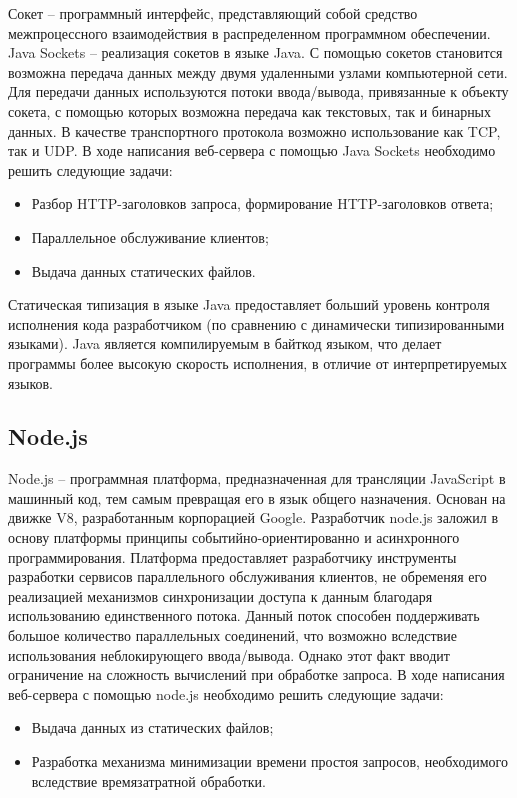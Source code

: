 Сокет – программный интерфейс, представляющий собой средство межпроцессного взаимодействия в распределенном программном обеспечении. Java Sockets – реализация сокетов в языке Java. С помощью сокетов становится возможна передача данных между двумя удаленными узлами компьютерной сети. Для передачи данных используются потоки ввода/вывода, привязанные к объекту сокета, с помощью которых возможна передача как текстовых, так и бинарных данных. В качестве транспортного протокола возможно использование как TCP, так и UDP. В ходе написания веб-сервера с помощью Java Sockets необходимо решить следующие задачи:

\begin{itemize}
	\item Разбор HTTP-заголовков запроса, формирование HTTP-заголовков ответа;
	\item Параллельное обслуживание клиентов;
	\item Выдача данных статических файлов.
\end{itemize}

Статическая типизация в языке Java предоставляет больший уровень контроля исполнения кода разработчиком (по сравнению с динамически типизированными языками). Java является компилируемым в байткод языком, что делает программы более высокую скорость исполнения, в отличие от интерпретируемых языков.

\subsection{Node.js}

Node.js – программная платформа, предназначенная для трансляции JavaScript в машинный код, тем самым превращая его в язык общего назначения. Основан на движке V8, разработанным корпорацией Google. Разработчик node.js заложил в основу платформы принципы событийно-ориентированно и асинхронного программирования. Платформа предоставляет разработчику инструменты разработки сервисов параллельного обслуживания клиентов, не обременяя его реализацией механизмов синхронизации доступа к данным благодаря использованию единственного потока. Данный поток способен поддерживать большое количество параллельных соединений, что возможно вследствие использования неблокирующего ввода/вывода. Однако этот факт вводит ограничение на сложность вычислений при обработке запроса. В ходе написания веб-сервера с помощью node.js необходимо решить следующие задачи:


\begin{itemize}
	\item Выдача данных из статических файлов;
	\item Разработка механизма минимизации времени простоя запросов, необходимого вследствие времязатратной обработки.
\end{itemize}

